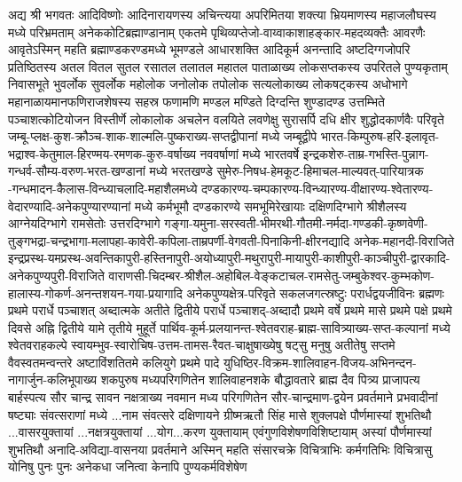 अद्य श्री भगवतः आदिविष्णोः आदिनारायणस्य अचिन्त्यया अपरिमितया शक्त्या भ्रियमाणस्य महाजलौघस्य मध्ये
परिभ्रमताम् अनेककोटिब्रह्माण्डानाम् एकतमे पृथिव्यप्तेजो-वाय्वाकाशाहङ्कार-महदव्यक्तैः आवरणैः
आवृतेऽस्मिन् महति ब्रह्माण्डकरण्डमध्ये भूमण्डले आधारशक्ति आदिकूर्म अनन्तादि अष्टदिग्गजोपरि
प्रतिष्ठितस्य अतल वितल सुतल रसातल तलातल महातल पाताळाख्य लोकसप्तकस्य उपरितले पुण्यकृताम् निवासभूते
भुवर्लोक सुवर्लोक महोलोक जनोलोक तपोलोक सत्यलोकाख्य लोकषट्कस्य अधोभागे महानाळायमानफणिराजशेषस्य सहस्र
फणामणि मण्डल मण्डिते दिग्दन्ति शुण्डादण्ड उत्तम्भिते पञ्चाशत्कोटियोजन विस्तीर्णे लोकालोक अचलेन
वलयिते लवणेक्षु सुरासर्पि दधि क्षीर शुद्धोदकार्णवैः परिवृते
जम्बू-प्लक्ष-कुश-क्रौञ्च-शाक-शाल्मलि-पुष्कराख्य-सप्तद्वीपानां मध्ये जम्बूद्वीपे
भारत-किम्पुरुष-हरि-इलावृत-भद्राश्व-केतुमाल-हिरण्मय-रमणक-कुरु-वर्षाख्य नववर्षाणां मध्ये भारतवर्षे
इन्द्रकशेरु-ताम्र-गभस्ति-पुन्नाग-गन्धर्व-सौम्य-वरुण-भरत-खण्डानां मध्ये भरतखण्डे
सुमेरु-निषध-हेमकूट-हिमाचल-माल्यवत्-पारियात्रक -गन्धमादन-कैलास-विन्ध्याचलादि-महाशैलमध्ये
दण्डकारण्य-चम्पकारण्य-विन्ध्यारण्य-वीक्षारण्य-श्वेतारण्य-वेदारण्यादि-अनेकपुण्यारण्यानां मध्ये
कर्मभूमौ दण्डकारण्ये समभूमिरेखायाः दक्षिणदिग्भागे श्रीशैलस्य आग्नेयदिग्भागे रामसेतोः उत्तरदिग्भागे
गङ्गा-यमुना-सरस्वती-भीमरथी-गौतमी-नर्मदा-गण्डकी-कृष्णवेणी-तुङ्गभद्रा-चन्द्रभागा-मलापहा-कावेरी-कपिला-ताम्रपर्णी-वेगवती-पिनाकिनी-क्षीरनद्यादि
अनेक-महानदी-विराजिते
इन्द्रप्रस्थ-यमप्रस्थ-अवन्तिकापुरी-हस्तिनापुरी-अयोध्यापुरी-मथुरापुरी-मायापुरी-काशीपुरी-काञ्चीपुरी-द्वारकादि-अनेकपुण्यपुरी-विराजिते
वाराणसी-चिदम्बर-श्रीशैल-अहोबिल-वेङ्कटाचल-रामसेतु-जम्बुकेश्वर-कुम्भकोण-हालास्य-गोकर्ण-अनन्तशयन-गया-प्रयागादि
अनेकपुण्यक्षेत्र-परिवृते सकलजगत्स्रष्टुः परार्धद्वयजीविनः ब्रह्मणः प्रथमे परार्धे पञ्चाशत्
अब्दात्मके अतीते द्वितीये परार्धे पञ्चाशद्-अब्दादौ प्रथमे वर्षे प्रथमे मासे प्रथमे पक्षे प्रथमे
दिवसे अह्नि द्वितीये यामे तृतीये मुहूर्ते
पार्थिव-कूर्म-प्रलयानन्त-श्वेतवराह-ब्राह्म-सावित्र्याख्य-सप्त-कल्पानां मध्ये श्वेतवराहकल्पे
स्वायम्भुव-स्वारोचिष-उत्तम-तामस-रैवत-चाक्षुषाख्येषु षट्सु मनुषु अतीतेषु सप्तमे वैवस्वतमन्वन्तरे
अष्टाविंशतितमे कलियुगे प्रथमे पादे युधिष्ठिर-विक्रम-शालिवाहन-विजय-अभिनन्दन-नागार्जुन-कलिभूपाख्य
शकपुरुष मध्यपरिगणितेन शालिवाहनशके बौद्धावतारे ब्राह्म दैव पित्र्य प्राजापत्य बार्हस्पत्य सौर चान्द्र
सावन नक्षत्राख्य नवमान मध्य परिगणितेन सौर-चान्द्रमाण-द्वयेन प्रवर्तमाने प्रभवादीनां षष्ट्याः
संवत्सराणां मध्ये ...नाम संवत्सरे दक्षिणायने ग्रीष्मऋतौ सिंह मासे शुक्लपक्षे पौर्णमास्यां शुभतिथौ
...वासरयुक्तायां ...नक्षत्रयुक्तायां ...योग...करण युक्तायाम् एवंगुणविशेषणविशिष्टायाम् अस्यां
पौर्णमास्यां शुभतिथौ  अनादि-अविद्या-वासनया प्रवर्तमाने अस्मिन् महति संसारचक्रे विचित्राभिः
कर्मगतिभिः विचित्रासु योनिषु पुनः पुनः अनेकधा जनित्वा केनापि पुण्यकर्मविशेषेण
